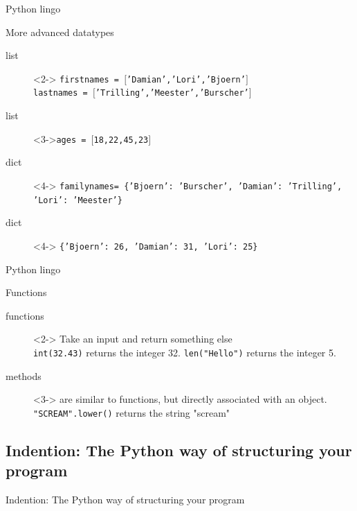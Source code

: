\documentclass{beamer}
\begin{document}
\begin{frame}{Python lingo}
\begin{block}{More advanced datatypes}
\begin{description}
\item[{\color{red}list}]<2-> \texttt{firstnames = $[$'Damian','Lori','Bjoern'$]$ \\ lastnames = $[$'Trilling','Meester','Burscher'$]$}
\item[{\color{red}list}]<3->\texttt{ages = $[$18,22,45,23$]$}
\item[{\color{red}dict}]<4-> \texttt{familynames= \{'Bjoern': 'Burscher', 'Damian': 'Trilling', 'Lori': 'Meester'\} }
\item[{\color{red}dict}]<4-> \texttt{\{'Bjoern': 26, 'Damian': 31, 'Lori': 25\} }

\end{description}
\end{block}
\end{frame}



\begin{frame}{Python lingo}
\begin{block}{Functions}
\begin{description}
\item[{\color{red}functions}]<2-> Take an input and return something else \\ {\tt{int(32.43})} returns the integer 32. \texttt{len("Hello")} returns the integer 5.\\ 
\item[{\color{red}methods}]<3-> are similar to functions, but directly associated with an object. {\tt{"SCREAM".lower()}} returns the string "scream"
\end{description}
\end{block}
\end{frame}


\subsection[Indention]{Indention: The Python way of structuring your program}
\begin{frame}[plain]
Indention: The Python way of structuring your program
\end{frame}
\end{document}

